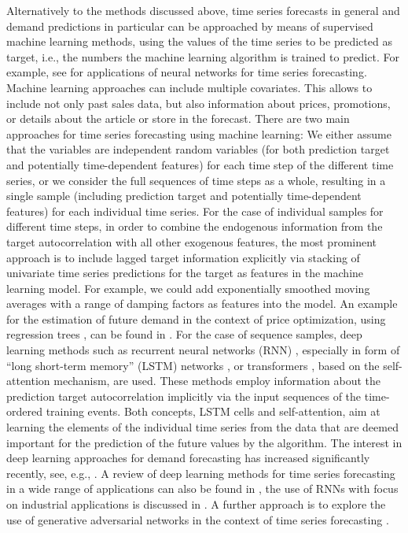 \documentclass[BCOR=1mm, DIV=calc,10pt,
twoside=true,
twocolumn,
headings=normal]{scrartcl}
\begin{document}
Alternatively to the methods discussed above, time series forecasts in general and demand predictions in particular can be approached by means of supervised machine learning methods, using the values of the time series to be predicted as target, i.e., the numbers the machine learning algorithm is trained to predict.  For example, see \cite{Zhang2012,remus2001neural} for applications of neural networks for time series forecasting. Machine learning approaches can include multiple covariates. This allows to include not only past sales data, but also information about prices, promotions, or details about the article or store in the forecast. There are two main approaches for time series forecasting using  machine learning: We either assume that the variables are independent random variables (for both prediction target and potentially time-dependent features) for each time step of the different time series, or we consider the full sequences of time steps as a whole, resulting in a single sample (including prediction target and potentially time-dependent features) for each individual time series. For the case of individual samples for different time steps, in order to combine the endogenous information from the target autocorrelation with all other exogenous features, the most prominent approach is to include lagged target information explicitly via stacking of univariate time series predictions for the target as features in the machine learning model. For example, we could add exponentially smoothed moving averages with a range of damping factors as features into the model. An example for the estimation of future demand in the context of price optimization, using regression trees \cite{breiman1984}, can be found in \cite{ferreira2016analytics}. For the case of sequence samples, deep learning methods such as recurrent neural networks (RNN) \cite{rnn}, especially in form of ``long short-term memory'' (LSTM) networks \cite{hochreiter1997long}, or transformers \cite{transformer}, based on the self-attention mechanism, are used. These methods employ information about the prediction target autocorrelation implicitly via the input sequences of the time-ordered training events. Both concepts, LSTM cells and self-attention, aim at learning  the elements of the individual time series from the data that are deemed important for the prediction of the future values by the algorithm. The interest in deep learning approaches for demand forecasting has increased significantly recently, see, e.g., \cite{bandara2019sales,yu2017application, goyal2018solution,helmini2019sales, golkabek2020demand}. A review of deep learning methods for time series forecasting in a wide range of applications can also be found in \cite{langkvist2014review}, the use of RNNs with focus on industrial applications is discussed in \cite{dixon2020industrial}. A further approach is to explore the use of generative adversarial networks \cite{goodfellow2014generative} in the context of time series forecasting \cite{haas2020statistical, ramponi2018t, smith2020conditional}. 
\end{document}
